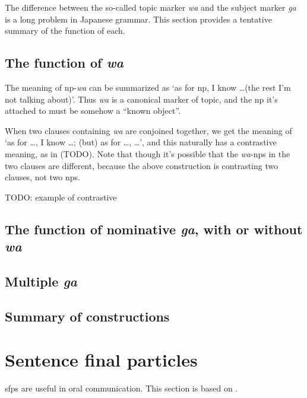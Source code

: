 \documentclass[UTF8, a4paper, oneside, scheme=plain]{ctexrep}
\newcommand*{\citesec}[1]{\S~{#1}}
\newcommand{\corpus}[1]{\emph{#1}}
\newcommand{\translate}[1]{`#1'}
\begin{document}
The difference between the so-called topic marker \corpus{wa} and the subject marker \corpus{ga}
is a long problem in Japanese grammar.
This section provides a tentative summary of the function of each.

\subsection{The function of \corpus{wa}}\label{sec:wa-topic}

The meaning of \ac{np}-\corpus{wa} can be summarized as 
\translate{as for \ac{np}, I know \dots (the rest I'm not talking about)}.
Thus \corpus{wa} is a canonical marker of topic,
and the \ac{np} it's attached to must be somehow a ``known object''.

When two clauses containing \corpus{wa} are conjoined together,
we get the meaning of 
\translate{as for \dots, I know \dots; (but) as for \dots, \dots},
and this naturally has a contrastive meaning, as in (TODO).
Note that though it's possible that the \corpus{wa}-\ac{np}s in the two clauses are different,
because the above construction is contrasting two clauses, not two \ac{np}s.

\begin{exe}
    \ex TODO: example of contrastive  
\end{exe}

\subsection{The function of nominative \corpus{ga}, with or without \corpus{wa}} 

\subsection{Multiple \corpus{ga}}\label{sec:multiple-ga}

\subsection{Summary of constructions}\label{sec:wa-ga-template}

\section{Sentence final particles}\label{sec:sfp}

\ac{sfp}s are useful in oral communication.
This section is based on \citet[\citesec{6.4}]{akiyama2012japanese}.
\end{document}
